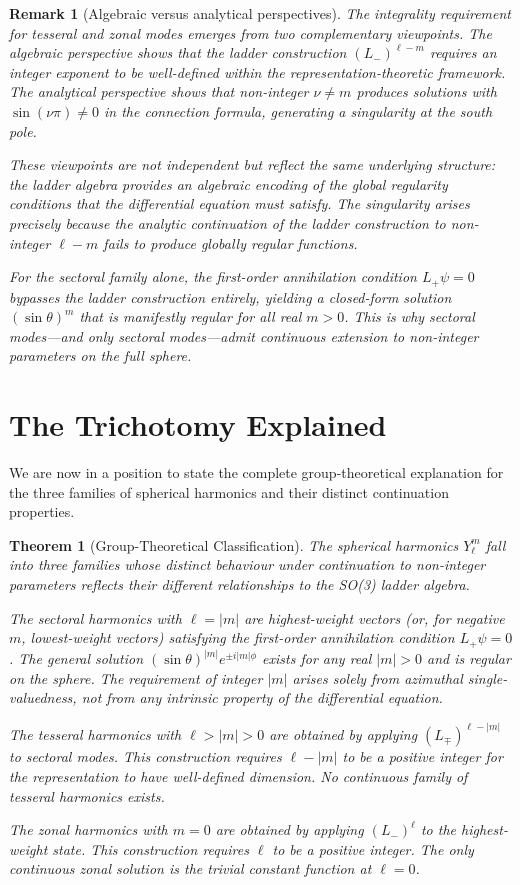 \documentclass[
  aip,
  amsmath,amssymb,
  preprint
]{revtex4-1}
\newtheorem{theorem}{Theorem}[section]
\newtheorem{remark}{Remark}[section]
\begin{document}
\begin{remark}[Algebraic versus analytical perspectives]
\label{rem:perspectives}
The integrality requirement for tesseral and zonal modes emerges from two complementary viewpoints. The algebraic perspective shows that the ladder construction $(L_-)^{\ell-m}$ requires an integer exponent to be well-defined within the representation-theoretic framework. The analytical perspective shows that non-integer $\nu \neq m$ produces solutions with $\sin(\nu\pi) \neq 0$ in the connection formula, generating a singularity at the south pole. 

These viewpoints are not independent but reflect the same underlying structure: the ladder algebra provides an algebraic encoding of the global regularity conditions that the differential equation must satisfy. The singularity arises precisely because the analytic continuation of the ladder construction to non-integer $\ell - m$ fails to produce globally regular functions.

For the sectoral family alone, the first-order annihilation condition $L_+ \psi = 0$ bypasses the ladder construction entirely, yielding a closed-form solution $(\sin\theta)^m$ that is manifestly regular for all real $m > 0$. This is why sectoral modes---and only sectoral modes---admit continuous extension to non-integer parameters on the full sphere.
\end{remark}


\section{The Trichotomy Explained}
We are now in a position to state the complete group-theoretical explanation for the three families of spherical harmonics and their distinct continuation properties.

\begin{theorem}[Group-Theoretical Classification]
\label{thm:classification}
The spherical harmonics $Y_\ell^m$ fall into three families whose distinct behaviour under continuation to non-integer parameters reflects their different relationships to the SO(3) ladder algebra.

The sectoral harmonics with $\ell = |m|$ are highest-weight vectors (or, for negative $m$, lowest-weight vectors) satisfying the first-order annihilation condition $L_+ \psi = 0$. The general solution $(\sin\theta)^{|m|} e^{\pm i|m|\phi}$ exists for any real $|m| > 0$ and is regular on the sphere. The requirement of integer $|m|$ arises solely from azimuthal single-valuedness, not from any intrinsic property of the differential equation.

The tesseral harmonics with $\ell > |m| > 0$ are obtained by applying $(L_\mp)^{\ell - |m|}$ to sectoral modes. This construction requires $\ell - |m|$ to be a positive integer for the representation to have well-defined dimension. No continuous family of tesseral harmonics exists.

The zonal harmonics with $m = 0$ are obtained by applying $(L_-)^\ell$ to the highest-weight state. This construction requires $\ell$ to be a positive integer. The only continuous zonal solution is the trivial constant function at $\ell = 0$.
\end{theorem}
\end{document}
